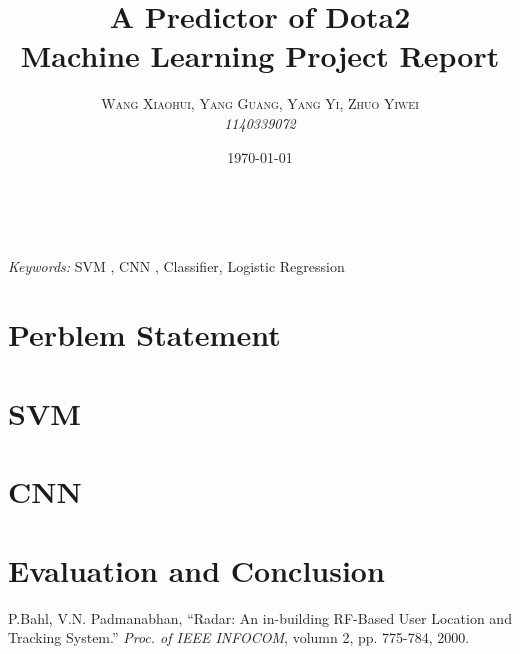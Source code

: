 \documentclass[a4paper, 11pt]{article} %
\title{\textbf{A Predictor of Dota2}\\ %
Machine Learning Project Report} %
\author{\textsc{Wang Xiaohui, Yang Guang, Yang Yi, Zhuo Yiwei} %
\\{\textit{1140339072}}} %
\date{\today} %
\makeatletter
\renewcommand{\maketitle}{ %
\begin{flushright} %
{\LARGE\@title} %

\vspace{50pt} %

{\large\@author} %
\\\@date %

\vspace{40pt} %
\end{flushright}
}
\makeatother
\begin{document}
\maketitle %



\begin{abstract}

\end{abstract}

\hspace*{3,6mm}\textit{Keywords:} SVM , CNN , Classifier, Logistic Regression %

\vspace{30pt} %


\section{Perblem Statement}

\section{SVM}

\section{CNN}

\section{Evaluation and Conclusion}



\begin{thebibliography}{10}

P.Bahl, V.N. Padmanabhan,
``Radar: An in-building RF-Based User Location and Tracking System.''
\textit{Proc. of IEEE INFOCOM}, volumn 2, pp. 775-784, 2000.

\end{thebibliography}

\end{document}
